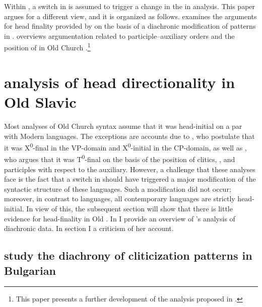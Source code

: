 \documentclass[output=paper,modfonts,newtxmath,hidelinks]{langscibook}
\begin{document}
Within , a switch in  is assumed to trigger a change in the  in  analysis. This paper argues for a different view, and it is organized as follows.  examines the arguments for head finality provided by \citet{pancheva2005} on the basis of a diachronic modification of  patterns in .  overviews  argumentation related to participle--auxiliary orders and the position of  in Old Church .\footnote{This paper presents a further development of the analysis proposed in \citet{migdalski2016}.}

\section{ analysis of head directionality in Old Slavic}\label{11:s2}

\sloppy Most analyses of Old Church  syntax \citep{willis2000,jung2015,jung-migdalski2015,migdalski2016} assume that it was head-initial on a par with Modern  languages. The exceptions are accounts due to \citet{dimitrovavulchanova-vulchanov2008}, who postulate that it was X\textsuperscript{0}{}-final in the VP-domain and X\textsuperscript{0}{}-initial in the CP-domain, as well as \citet{pancheva2005,pancheva2008}, who argues that it was T\textsuperscript{0}{}-final on the basis of the position of  clitics, , and participles with respect to the auxiliary. However, a challenge that these analyses face is the fact that a switch in  should have triggered a major modification of the syntactic structure of these languages. Such a modification did not occur; moreover, in contrast to  languages, all contemporary  languages are strictly head-initial. In view of this, the subsequent section will show that there is little evidence for head-finality in Old . In  I provide an overview of \citeauthor{pancheva2005}'s analysis of diachronic  data. In section  I  a criticism of her account.

\subsection{ study the diachrony of cliticization patterns in Bulgarian}\label{11:s2.1} 
\end{document}
